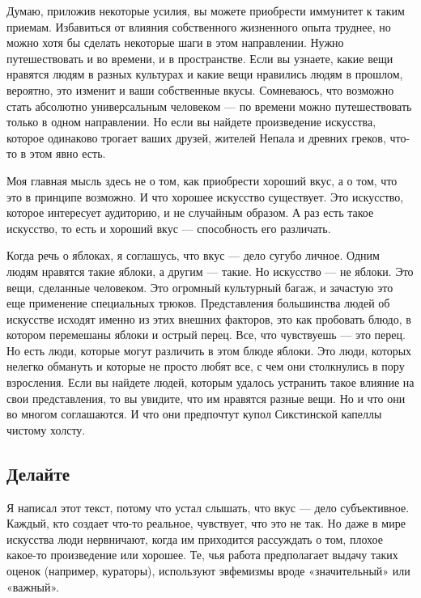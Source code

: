 \documentclass[ebook,12pt,oneside,openany]{memoir}
\begin{document}
Думаю, приложив некоторые усилия, вы можете приобрести иммунитет к
таким приемам. Избавиться от влияния собственного жизненного опыта
труднее, но можно хотя бы сделать некоторые шаги в этом направлении.
Нужно путешествовать и во времени, и в пространстве. Если вы узнаете,
какие вещи нравятся людям в разных культурах и какие вещи нравились
людям в прошлом, вероятно, это изменит и ваши собственные вкусы.
Сомневаюсь, что возможно стать абсолютно универсальным человеком — по
времени можно путешествовать только в одном направлении. Но если вы
найдете произведение искусства, которое одинаково трогает ваших
друзей, жителей Непала и древних греков, что-то в этом явно есть. \newline

Моя главная мысль здесь не о том, как приобрести хороший вкус, а о
том, что это в принципе возможно. И что хорошее искусство существует.
Это искусство, которое интересует аудиторию, и не случайным образом. А
раз есть такое искусство, то есть и хороший вкус — способность его
различать. \newline

Когда речь о яблоках, я соглашусь, что вкус — дело сугубо личное.
Одним людям нравятся такие яблоки, а другим — такие. Но искусство — не
яблоки. Это вещи, сделанные человеком. Это огромный культурный багаж,
и зачастую это еще применение специальных трюков. Представления
большинства людей об искусстве исходят именно из этих внешних
факторов, это как пробовать блюдо, в котором перемешаны яблоки и
острый перец. Все, что чувствуешь — это перец. Но есть люди, которые
могут различить в этом блюде яблоки. Это люди, которых нелегко
обмануть и которые не просто любят все, с чем они столкнулись в пору
взросления. Если вы найдете людей, которым удалось устранить такое
влияние на свои представления, то вы увидите, что им нравятся разные
вещи. Но и что они во многом соглашаются. И что они предпочтут купол
Сикстинской капеллы чистому холсту. \newline

\subsection{Делайте}

Я написал этот текст, потому что устал слышать, что вкус —
дело субъективное. Каждый, кто создает что-то реальное, чувствует, что
это не так. Но даже в мире искусства люди нервничают, когда им
приходится рассуждать о том, плохое какое-то произведение или хорошее.
Те, чья работа предполагает выдачу таких оценок (например, кураторы),
используют эвфемизмы вроде «значительный» или «важный». \newline
\end{document}
